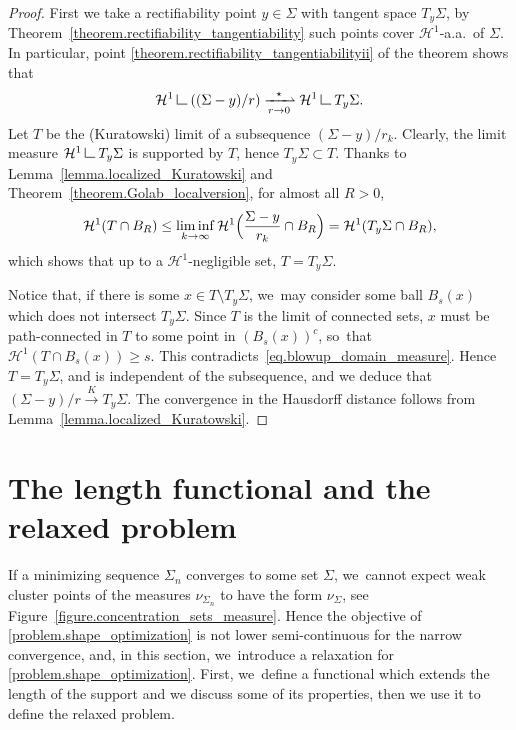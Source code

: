 \documentclass[11pt]{article}
\numberwithin{equation}{section}
\theoremstyle{definition}
\newcommand\LM[1]{\hbox{\vrule width.5pt \vbox to#1pt{\vfill \hrule width#1pt height.5pt}}}
\newcommand\LL{{\mathchoice {\>\LM7\>}{\>\LM7\>}{\,\LM5\,}{\,\LM{3.35}\,}}}
\newcommand{\mres}{\LL}
\newcommand\cH{\mathcal{H}}
\begin{document}
\begin{proof}
First we take a rectifiability point $y \in \Sigma$ with tangent space $T_y\Sigma$,
by Theorem~\ref{theorem.rectifiability_tangentiability} such points cover $\cH^1$-a.a.~of $\Sigma$.
In particular, point \eqref{theorem.rectifiability_tangentiabilityii} of the theorem shows that
\[
\cH^1\mres((\Sigma-y)/r)\xrightharpoonup[r \to 0]{\star} \cH^1\mres T_y\Sigma.
\]
Let $T$ be the (Kuratowski) limit of a subsequence $(\Sigma-y)/r_k$.
Clearly, the limit measure $\cH^1\mres T_y\Sigma$ is supported by $T$, hence $T_y\Sigma\subset T$.
Thanks
to Lemma~\ref{lemma.localized_Kuratowski} and Theorem~\ref{theorem.Golab_localversion}, for
almost all $R>0$,
\begin{equation}
\cH^1(T\cap B_R) \le \liminf_{k\to\infty} \cH^1\Bigl(\frac{\Sigma-y}{r_k}\cap B_R\Bigr)
= \cH^1(T_y\Sigma\cap B_R),\label{eq.blowup_domain_measure}
\end{equation}
which shows that up to a $\cH^1$-negligible set, $T=T_y\Sigma$.

Notice that, if there is some $x \in T\setminus T_y\Sigma$, we~may consider some ball $B_s(x)$ which does not intersect $T_y\Sigma$. Since $T$ is the limit of connected sets, $x$ must be path-connected in $T$ to some point in $(B_s(x))^c$, so~that $\cH^1(T\cap B_s(x))\ge s$. This contradicts~\eqref{eq.blowup_domain_measure}. Hence $T=T_y\Sigma$, and is independent of the subsequence, and we deduce that $(\Sigma-y)/r\stackrel{K}{\to} T_y\Sigma$. The convergence in the Hausdorff distance follows from Lemma~\ref{lemma.localized_Kuratowski}.
\end{proof}

\section{The length functional and the relaxed problem}\label{section.the_problem}
If a minimizing sequence $\Sigma_n$ converges to some set $\Sigma$, we~cannot expect weak cluster points of the measures $\nu_{\Sigma_n}$ to have the form $\nu_\Sigma$, see Figure~\ref{figure.concentration_sets_measure}. Hence the objective of \eqref{problem.shape_optimization} is not lower semi-continuous for the narrow convergence, and, in this section, we~introduce a relaxation for \eqref{problem.shape_optimization}. First, we~define a functional which extends the length of the support and we discuss some of its properties, then we use it to define the relaxed problem.
\end{document}
